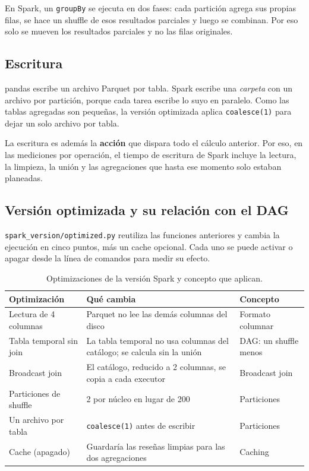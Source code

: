 \documentclass[11pt,a4paper]{article}
\begin{document}
En Spark, un \texttt{groupBy} se ejecuta en dos fases: cada partición agrega sus propias
filas, se hace un shuffle de esos resultados parciales y luego se combinan. Por eso solo se
mueven los resultados parciales y no las filas originales.

\subsection{Escritura}

pandas escribe un archivo Parquet por tabla. Spark escribe una \emph{carpeta} con un archivo
por partición, porque cada tarea escribe lo suyo en paralelo. Como las tablas agregadas son
pequeñas, la versión optimizada aplica \texttt{coalesce(1)} para dejar un solo archivo por
tabla.

La escritura es además la \textbf{acción} que dispara todo el cálculo anterior. Por eso, en
las mediciones por operación, el tiempo de escritura de Spark incluye la lectura, la
limpieza, la unión y las agregaciones que hasta ese momento solo estaban planeadas.

\subsection{Versión optimizada y su relación con el DAG}

\texttt{spark\_version/optimized.py} reutiliza las funciones anteriores y cambia la ejecución
en cinco puntos, más un cache opcional. Cada uno se puede activar o apagar desde la línea de comandos para medir su efecto.

\begin{table}[H]
\centering
\small
\caption{Optimizaciones de la versión Spark y concepto que aplican.}
\label{tab:optimizaciones}
\begin{tabularx}{\textwidth}{lXl}
\toprule
Optimización & Qué cambia & Concepto \\
\midrule
Lectura de 4 columnas & Parquet no lee las demás columnas del disco & Formato columnar \\
Tabla temporal sin join & La tabla temporal no usa columnas del catálogo; se calcula sin la unión & DAG: un shuffle menos \\
Broadcast join & El catálogo, reducido a 2 columnas, se copia a cada executor & Broadcast join \\
Particiones de shuffle & 2 por núcleo en lugar de 200 & Particiones \\
Un archivo por tabla & \texttt{coalesce(1)} antes de escribir & Particiones \\
Cache (apagado) & Guardaría las reseñas limpias para las dos agregaciones & Caching \\
\bottomrule
\end{tabularx}
\end{table}
\end{document}
